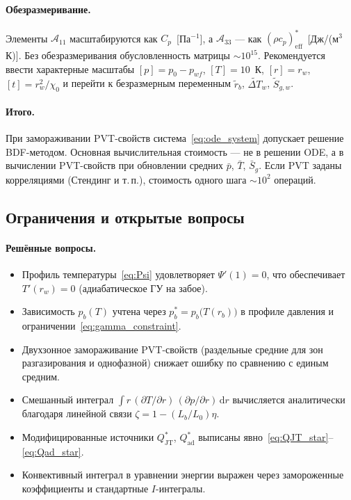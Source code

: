 \documentclass[12pt,a4paper]{article}
\newcommand{\dd}{\mathrm{d}}
\newcommand{\pp}{\partial}
\newcommand{\eff}{\mathrm{eff}}
\begin{document}
\paragraph{Обезразмеривание.}
Элементы $\mathcal{A}_{11}$ масштабируются как $C_p$~[Па$^{-1}$],
а $\mathcal{A}_{33}$ --- как $(\rho c_p)_\eff^*$~[Дж/(м$^3$\,К)].
Без обезразмеривания обусловленность матрицы $\sim 10^{15}$.
Рекомендуется ввести характерные масштабы
$[p] = p_0 - p_{wf}$, $[T] = 10$~К, $[r] = r_w$, $[t] = r_w^2/\chi_0$
и перейти к безразмерным переменным $\tilde{r}_b$,
$\tilde{\Delta T}_w$, $\tilde{S}_{g,w}$.

\paragraph{Итого.}
При замораживании PVT-свойств система~\eqref{eq:ode_system}
допускает решение BDF-методом.
Основная вычислительная стоимость --- не в решении ODE,
а в вычислении PVT-свойств при обновлении средних $\bar{p}$,
$\bar{T}$, $\bar{S}_g$. Если PVT заданы корреляциями (Стендинг
и т.\,п.), стоимость одного шага $\sim 10^2$ операций.


\subsection{Ограничения и открытые вопросы}

\paragraph{Решённые вопросы.}
\begin{itemize}[nosep]
  \item Профиль температуры~\eqref{eq:Psi} удовлетворяет
        $\Psi'(1) = 0$, что обеспечивает $T'(r_w) = 0$
        (адиабатическое ГУ на забое).
  \item Зависимость $p_b(T)$ учтена через
        $p_b^* = p_b\bigl(T(r_b)\bigr)$
        в профиле давления и ограничении~\eqref{eq:gamma_constraint}.
  \item Двухзонное замораживание PVT-свойств
        (раздельные средние для зон разгазирования и однофазной)
        снижает ошибку по сравнению с единым средним.
  \item Смешанный интеграл $\int r\,(\pp T/\pp r)\,(\pp p/\pp r)\,\dd r$
        вычисляется аналитически благодаря линейной связи
        $\zeta = 1 - (L_b/L_0)\eta$.
  \item Модифицированные источники $Q_\mathrm{JT}^*$,
        $Q_\mathrm{ad}^*$ выписаны
        явно~\eqref{eq:QJT_star}--\eqref{eq:Qad_star}.
  \item Конвективный интеграл в уравнении энергии
        выражен через замороженные коэффициенты
        и стандартные $I$-интегралы.
\end{itemize}
\end{document}
